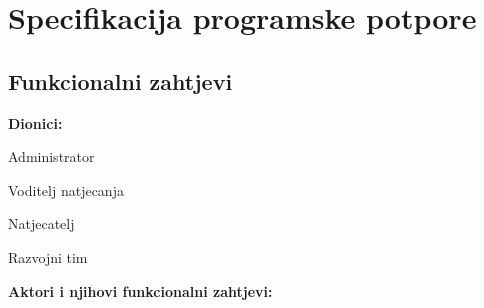 \chapter{Specifikacija programske potpore}
		
	\section{Funkcionalni zahtjevi}			
			
			\noindent \textbf{Dionici:}
			
			\begin{packed_enum}
				
				\item Administrator
				\item Voditelj natjecanja				
				\item Natjecatelj
				\item Razvojni tim
				
			\end{packed_enum}
			
			\noindent \textbf{Aktori i njihovi funkcionalni zahtjevi:}
			
